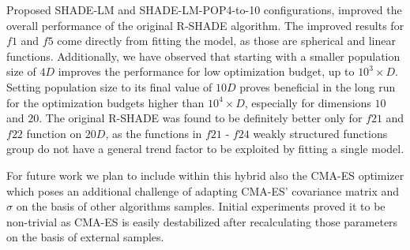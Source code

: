 \documentclass[sigconf]{acmart}
\begin{document}
Proposed SHADE-LM and SHADE-LM-POP4-to-10 configurations,
improved the overall performance of the original R-SHADE algorithm.
The improved results for $f1$ and $f5$ come directly from fitting the model,
as those are spherical and linear functions.
Additionally, we have observed that starting with a smaller population size
of $4D$ improves the performance for low optimization budget,
up to $10^3 \times D$. Setting population size to its final value
of $10D$ proves beneficial in the long run for the optimization
budgets higher than $10^4 \times D$, especially for dimensions $10$
and $20$.
The original R-SHADE was found to be definitely better only for $f21$
and $f22$ function on $20D$,
as the functions in $f21$ - $f24$
weakly structured functions group do not have a general trend factor
to be exploited by fitting a single model.


For future work we plan to include within this hybrid also the CMA-ES
optimizer which poses an additional challenge of adapting CMA-ES' covariance
matrix and $\sigma$ on the basis of other algorithms samples.
Initial experiments proved it to be non-trivial as CMA-ES is easily destabilized
after recalculating those parameters on the basis of external samples.


\end{document}
